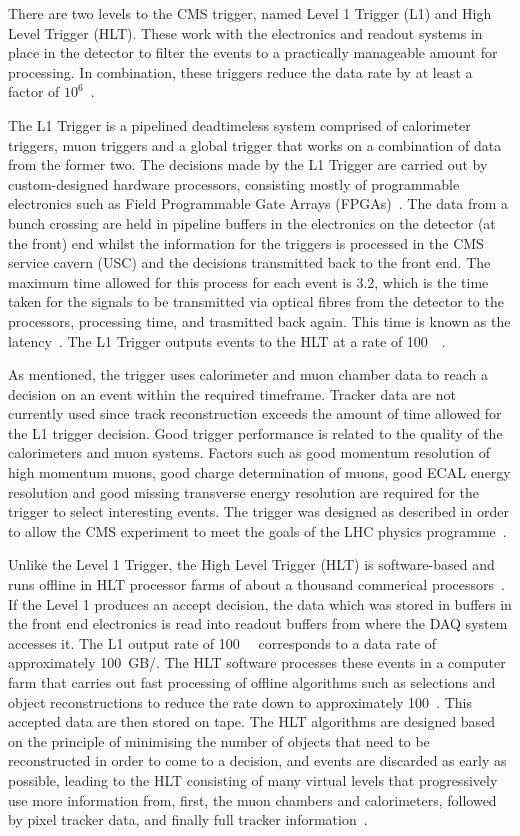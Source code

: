 There are two levels to the CMS trigger, named Level 1 Trigger (L1) and High Level Trigger (HLT). These work
with the electronics and readout systems in place in the detector to filter the events to a practically
manageable amount for processing. In combination, these triggers reduce the data rate by at least a factor of
$10^{6}$~\cite{CMS_experiment}.

The L1 Trigger is a pipelined deadtimeless system comprised of calorimeter triggers, muon triggers and a
global trigger that works on a combination of data from the former two. The decisions made by the L1 Trigger
are carried out by custom-designed hardware processors, consisting mostly of programmable electronics such
as Field Programmable Gate Arrays (FPGAs)~\cite{1742-6596-219-3-032009}. The data from a bunch crossing are held in
pipeline buffers in the electronics on the detector (at the front) end whilst the information for the triggers
is processed in the CMS service cavern (USC) and the decisions transmitted back to the front end. The maximum
time allowed for this process for each event is 3.2\us, which is the time taken for the signals to be
transmitted via optical fibres from the detector to the processors, processing time, and trasmitted back
again. This time is known as the latency~\cite{CMS_TDR1}. The L1 Trigger outputs events to the HLT at a rate
of 100~\kHz~\cite{CMS_experiment}.

As mentioned, the trigger uses calorimeter and muon chamber data to reach a decision on an event
within the required timeframe. Tracker data are not currently used since track reconstruction exceeds the
amount of time allowed for the L1 trigger decision. Good trigger performance is related to the quality of the
calorimeters and muon systems. Factors such as good momentum resolution of high momentum muons, good charge
determination of muons, good ECAL energy resolution and good missing transverse energy resolution are required
for the trigger to select interesting events. The trigger was designed as described in order to allow the CMS
experiment to meet the goals of the LHC physics programme~\cite{CMS_experiment}.

Unlike the Level 1 Trigger, the High Level Trigger (HLT) is software-based and runs offline in HLT processor
farms of about a thousand commerical processors~\cite{CMS_TDR1}. If the Level 1 produces an accept decision,
the data which was stored in buffers in the front end electronics is read into readout buffers from where the
DAQ system accesses it. The L1 output rate of 100~\kHz~ corresponds to a data rate of approximately 100~GB/\s.
The HLT software processes these events in a computer farm that carries out fast processing of offline
algorithms such as selections and object reconstructions to reduce the rate down to approximately 100~\Hz.
This accepted data are then stored on tape. The HLT algorithms are designed based on the principle of
minimising the number of objects that need to be reconstructed in order to come to a decision, and events are
discarded as early as possible, leading to the HLT consisting of many virtual levels that progressively use
more information from, first, the muon chambers and calorimeters, followed by pixel tracker data, and finally
full tracker information~\cite{CMS_TDR1}.

